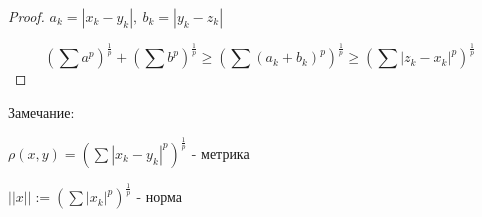 \begin{proof}
    $a_k = |x_k - y_k|,\ b_k = |y_k - z_k|$

    \[ \left( \sum a^p \right)^\frac{1}{p} + \left( \sum b^p \right)^\frac{1}{p} 
    \geq \left( \sum (a_k+b_k)^p \right)^\frac{1}{p} \geq \left( \sum |z_k-x_k|^p \right)^\frac{1}{p} \]
    
\end{proof}

Замечание:

$\rho(x, y) = \left( \sum |x_k-y_k|^p \right)^\frac{1}{p}$ - метрика

$||x|| := \left( \sum |x_k|^p \right)^\frac{1}{p}$ - норма